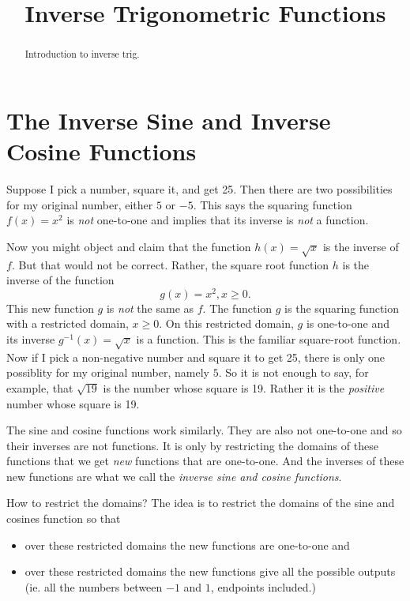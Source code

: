 \documentclass{ximera}
\title{Inverse Trigonometric Functions}
\begin{document}
\begin{abstract}
Introduction to inverse trig.
\end{abstract}
\maketitle

\section{The Inverse Sine and Inverse Cosine Functions}
Suppose I pick a number, square it, and get 25. Then there are two possibilities for my original number, either $5$ or $-5$. This says the squaring function $f(x)=x^2$ is \emph{not} one-to-one and implies that its inverse is \emph{not} a function. 

Now you might object and claim that the function $h(x)=\sqrt{x}$ is the inverse of $f$. But that would not be correct. Rather, the square root function $h$ is the inverse of the  function
\[
    g(x) = x^2 , x\geq 0 .
\]
This new function $g$ is \emph{not} the same as $f$. The function $g$ is the squaring function with a restricted domain, $x\geq 0$. On this restricted domain, $g$ is one-to-one and its inverse $g^{-1}(x) = \sqrt{x}$ is a function. This is the familiar square-root function. Now if I pick a non-negative number and square it to get 25, there is only one possiblity for my original number, namely $5$. So it is not enough to say, for example, that $\sqrt{19}$ is the number whose square is 19. Rather it is the \emph{positive} number whose square is 19.

The sine and cosine functions work similarly. They are also not one-to-one and so their inverses are not functions. It is only by restricting the domains of these functions that we get \emph{new} functions that are one-to-one. And the inverses of these new functions are what we call the \emph{inverse sine and cosine functions}.

How to restrict the domains? The idea is to restrict the domains of the sine and cosines function so that 
\begin{itemize}

\item{over these restricted domains the new functions are one-to-one and}

\item{over these restricted domains the new functions give all the possible outputs (ie. all the numbers between $-1$ and $1$, endpoints included.)}

\end{itemize}
\end{document}
